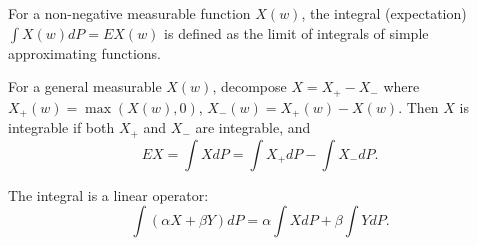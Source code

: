 For a non-negative measurable function $X(w)$, the integral (expectation) $\int X(w) dP = EX(w)$ is defined as the limit of integrals of simple approximating functions.

For a general measurable $X(w)$, decompose $X = X_+ - X_-$ where $X_+(w) = \max(X(w), 0)$, $X_-(w) = X_+(w) - X(w)$. Then $X$ is integrable if both $X_+$ and $X_-$ are integrable, and
$$EX = \int X dP = \int X_+ dP - \int X_- dP.$$

The integral is a linear operator:
$$\int (\alpha X + \beta Y) dP = \alpha \int X dP + \beta \int Y dP.$$
